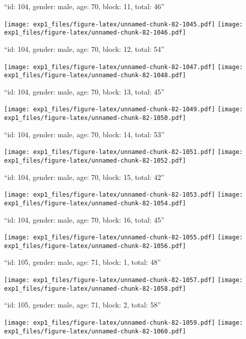 \documentclass[11pt,,]{article}
\begin{document}
\newpage
[1] 

``id: 104, gender: male, age: 70, block: 11, total: 46''

\texttt{[image: exp1\_files/figure-latex/unnamed-chunk-82-1045.pdf]}
\texttt{[image: exp1\_files/figure-latex/unnamed-chunk-82-1046.pdf]}

\newpage
[1] 

``id: 104, gender: male, age: 70, block: 12, total: 54''

\texttt{[image: exp1\_files/figure-latex/unnamed-chunk-82-1047.pdf]}
\texttt{[image: exp1\_files/figure-latex/unnamed-chunk-82-1048.pdf]}

\newpage
[1] 

``id: 104, gender: male, age: 70, block: 13, total: 45''

\texttt{[image: exp1\_files/figure-latex/unnamed-chunk-82-1049.pdf]}
\texttt{[image: exp1\_files/figure-latex/unnamed-chunk-82-1050.pdf]}

\newpage
[1] 

``id: 104, gender: male, age: 70, block: 14, total: 53''

\texttt{[image: exp1\_files/figure-latex/unnamed-chunk-82-1051.pdf]}
\texttt{[image: exp1\_files/figure-latex/unnamed-chunk-82-1052.pdf]}

\newpage
[1] 

``id: 104, gender: male, age: 70, block: 15, total: 42''

\texttt{[image: exp1\_files/figure-latex/unnamed-chunk-82-1053.pdf]}
\texttt{[image: exp1\_files/figure-latex/unnamed-chunk-82-1054.pdf]}

\newpage
[1] 

``id: 104, gender: male, age: 70, block: 16, total: 45''

\texttt{[image: exp1\_files/figure-latex/unnamed-chunk-82-1055.pdf]}
\texttt{[image: exp1\_files/figure-latex/unnamed-chunk-82-1056.pdf]}

\newpage
[1] 

``id: 105, gender: male, age: 71, block: 1, total: 48''

\texttt{[image: exp1\_files/figure-latex/unnamed-chunk-82-1057.pdf]}
\texttt{[image: exp1\_files/figure-latex/unnamed-chunk-82-1058.pdf]}

\newpage
[1] 

``id: 105, gender: male, age: 71, block: 2, total: 58''

\texttt{[image: exp1\_files/figure-latex/unnamed-chunk-82-1059.pdf]}
\texttt{[image: exp1\_files/figure-latex/unnamed-chunk-82-1060.pdf]}
\end{document}
